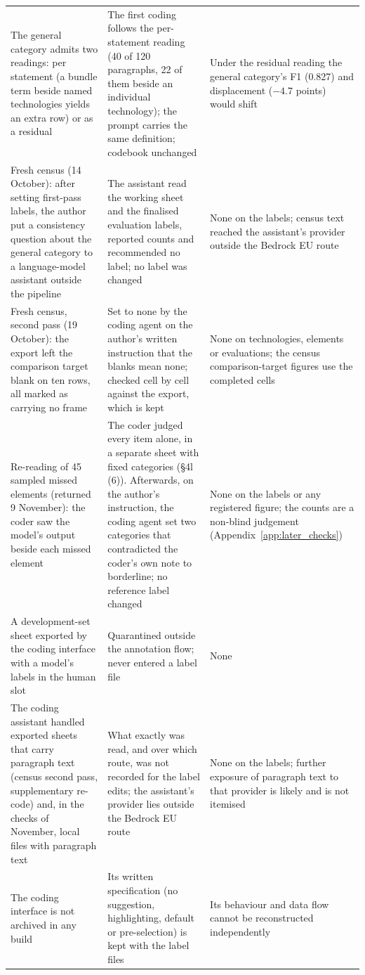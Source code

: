 \begin{longtable}{@{}>{\raggedright\arraybackslash}p{36mm}>{\raggedright\arraybackslash}p{64mm}>{\raggedright\arraybackslash}p{52mm}@{}}
The general category admits two readings: per statement (a bundle term beside named technologies yields an extra row) or as a residual & The first coding follows the per-statement reading (40 of 120 paragraphs, 22 of them beside an individual technology); the prompt carries the same definition; codebook unchanged & Under the residual reading the general category's F1 (0.827) and displacement ($-4.7$ points) would shift \\
Fresh census (14 October): after setting first-pass labels, the author put a consistency question about the general category to a language-model assistant outside the pipeline & The assistant read the working sheet and the finalised evaluation labels, reported counts and recommended no label; no label was changed & None on the labels; census text reached the assistant's provider outside the Bedrock EU route \\
Fresh census, second pass (19 October): the export left the comparison target blank on ten rows, all marked as carrying no frame & Set to none by the coding agent on the author's written instruction that the blanks mean none; checked cell by cell against the export, which is kept & None on technologies, elements or evaluations; the census comparison-target figures use the completed cells \\
Re-reading of 45 sampled missed elements (returned 9 November): the coder saw the model's output beside each missed element & The coder judged every item alone, in a separate sheet with fixed categories (\S4l (6)). Afterwards, on the author's instruction, the coding agent set two categories that contradicted the coder's own note to borderline; no reference label changed & None on the labels or any registered figure; the counts are a non-blind judgement (Appendix~\ref{app:later_checks}) \\
A development-set sheet exported by the coding interface with a model's labels in the human slot & Quarantined outside the annotation flow; never entered a label file & None \\
The coding assistant handled exported sheets that carry paragraph text (census second pass, supplementary re-code) and, in the checks of November, local files with paragraph text & What exactly was read, and over which route, was not recorded for the label edits; the assistant's provider lies outside the Bedrock EU route & None on the labels; further exposure of paragraph text to that provider is likely and is not itemised \\
The coding interface is not archived in any build & Its written specification (no suggestion, highlighting, default or pre-selection) is kept with the label files & Its behaviour and data flow cannot be reconstructed independently \\

\end{longtable}
